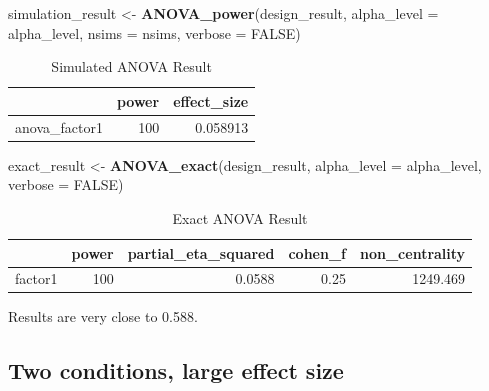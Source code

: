 \documentclass[]{book}
\newenvironment{Shaded}{\begin{snugshade}}{\end{snugshade}}
\newcommand{\DataTypeTok}[1]{\textcolor[rgb]{0.13,0.29,0.53}{#1}}
\newcommand{\KeywordTok}[1]{\textcolor[rgb]{0.13,0.29,0.53}{\textbf{#1}}}
\newcommand{\NormalTok}[1]{#1}
\newcommand{\OtherTok}[1]{\textcolor[rgb]{0.56,0.35,0.01}{#1}}
\newcommand{\StringTok}[1]{\textcolor[rgb]{0.31,0.60,0.02}{#1}}
\begin{document}
\begin{Shaded}
\begin{Highlighting}[]
\NormalTok{simulation_result <-}\StringTok{ }\KeywordTok{ANOVA_power}\NormalTok{(design_result, }
                                 \DataTypeTok{alpha_level =}\NormalTok{ alpha_level, }
                                 \DataTypeTok{nsims =}\NormalTok{ nsims,}
                                 \DataTypeTok{verbose =} \OtherTok{FALSE}\NormalTok{)}
\end{Highlighting}
\end{Shaded}

\begin{table}[!h]

\caption{\label{tab:unnamed-chunk-86}Simulated ANOVA Result}
\centering
\begin{tabular}{l|r|r}
\hline
  & power & effect\_size\\
\hline
anova\_factor1 & 100 & 0.058913\\
\hline
\end{tabular}
\end{table}

\begin{Shaded}
\begin{Highlighting}[]
\NormalTok{exact_result <-}\StringTok{ }\KeywordTok{ANOVA_exact}\NormalTok{(design_result,}
                            \DataTypeTok{alpha_level =}\NormalTok{ alpha_level,}
                            \DataTypeTok{verbose =} \OtherTok{FALSE}\NormalTok{)}
\end{Highlighting}
\end{Shaded}

\begin{table}[!h]

\caption{\label{tab:unnamed-chunk-88}Exact ANOVA Result}
\centering
\begin{tabular}{l|r|r|r|r}
\hline
  & power & partial\_eta\_squared & cohen\_f & non\_centrality\\
\hline
factor1 & 100 & 0.0588 & 0.25 & 1249.469\\
\hline
\end{tabular}
\end{table}

Results are very close to 0.588.

\hypertarget{two-conditions-large-effect-size}{%
\subsection{Two conditions, large effect size}\label{two-conditions-large-effect-size}}
\end{document}
